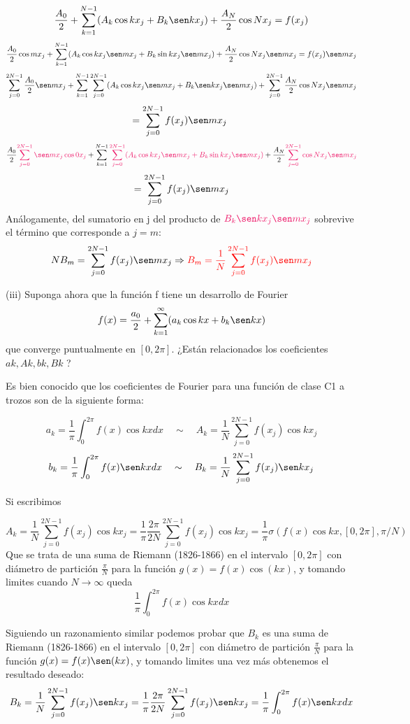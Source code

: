 \documentclass{article}
\begin{document}
$$
\frac{A_0}{2} + \sum_{k=1}^{N-1} (A_k \cos k x_j + B_k \sen k x_j) + \frac{A_N}{2} \cos N x_j = f(x_j)
$$
$$
\frac{A_0}{2}\cos m x_j + \sum_{k=1}^{N-1} (A_k \cos k x_j \sen m x_j + B_k \sin k x_j \sen m x_j) + \frac{A_N}{2}\cos N x_j \sen m x_j = f(x_j)\sen m x_j
$$
$$
\sum_{j=0}^{2N-1} \frac{A_0}{2}\sen m x_j + \sum_{k=1}^{N-1} \sum_{j=0}^{2N-1}(A_k \cos k x_j \sen m x_j + B_k \sen k x_j \sen m x_j) + \sum_{j=0}^{2N-1} \frac{A_N}{2}\cos N x_j \sen m x_j
$$
$$
= \sum_{j=0}^{2N-1} f(x_j)\sen m x_j\
$$
$$
\frac{A_0}{2} \textcolor{WildStrawberry}{ \sum_{j=0}^{2N-1} \sen m x_j \cos 0 x_j } + \sum_{k=1}^{N-1} \textcolor{WildStrawberry}{ \sum_{j=0}^{2N-1}(A_k \cos k x_j \sen m x_j + B_k \sin k x_j \sen m x_j ) } + \frac{A_N}{2} \textcolor{WildStrawberry}{ \sum_{j=0}^{2N-1}\cos N x_j \sen m x_j }
$$
$$
= \sum_{j=0}^{2N-1} f(x_j)\sen m x_j
$$
Análogamente, del sumatorio en j del producto de $\textcolor{WildStrawberry}{B_k \sen k x_j \sen m x_j}$ sobrevive el término que corresponde a $j=m$:
$$
N B_m  = \sum_{j=0}^{2N-1} f(x_j)\sen m x_j \Rightarrow \textcolor{red}{B_m = \frac{1}{N} \sum_{j=0}^{2N-1} f(x_j)\sen m x_j}
$$



\noindent (iii) Suponga ahora que la función f tiene un desarrollo de Fourier
$$
f(x) = \frac{a_0}{2} + \sum_{k=1}^{\infty} (a_k \cos kx + b_k \sen kx)
$$
que converge puntualmente en $[0, 2\pi]$. ¿Están relacionados los coeficientes $ak, Ak, bk, Bk$ ?

\noindent Es bien conocido que los coeficientes de Fourier para una función de clase C1 a trozos son de la siguiente forma:

$$
a_k =  \frac{1}{\pi} \int_0^{2\pi}f(x)\cos kxdx \quad \sim \quad A_k = \frac{1}{N} \sum_{j=0}^{2N-1} f(x_j) \cos kx_j
$$
$$
b_k =  \frac{1}{\pi} \int_0^{2\pi}f(x)\sen kxdx \quad \sim \quad B_k = \frac{1}{N} \sum_{j=0}^{2N-1} f(x_j) \sen kx_j
$$

\noindent Si escribimos 

$$
A_k = \frac{1}{N} \sum_{j=0}^{2N-1} f(x_j) \cos kx_j = \frac{1}{\pi} \frac{2\pi}{2N} \sum_{j=0}^{2N-1} f(x_j) \cos kx_j = \frac{1}{\pi} \sigma(f(x)\cos kx, [0,2\pi], \pi/N)
$$
\noindent Que se trata de una suma de Riemann (1826-1866) en el intervalo $[0,2\pi]$ con diámetro de partición $\frac{\pi}{N}$ para la función $g(x)=f(x)\cos(kx)$, y tomando limites cuando $N\to\infty$ queda
$$
\frac{1}{\pi}\int_0^{2\pi} f(x) \cos kx dx
$$

\noindent Siguiendo un razonamiento similar podemos probar que $B_k$ es una suma de Riemann (1826-1866) en el intervalo $[0,2\pi]$ con diámetro de partición $\frac{\pi}{N}$ para la función $g(x)=f(x)\sen(kx)$, y tomando limites una vez más obtenemos el resultado deseado:
$$
B_k = \frac{1}{N} \sum_{j=0}^{2N-1} f(x_j) \sen kx_j = \frac{1}{\pi} \frac{2\pi}{2N} \sum_{j=0}^{2N-1} f(x_j) \sen kx_j = \frac{1}{\pi}\int_0^{2\pi} f(x) \sen kx dx
$$
\end{document}
